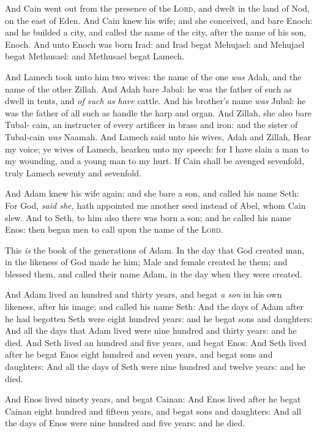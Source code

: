 \documentclass[11pt,letterpaper,oneside]{memoir}
\begin{document}
And Cain went out from the presence of the \textsc{Lord}, and dwelt in the
land of Nod, on the east of Eden. And Cain knew his wife; and she
conceived, and bare Enoch: and he builded a city, and called the name of
the city, after the name of his son, Enoch. And unto Enoch was born
Irad: and Irad begat Mehujael: and Mehujael begat Methusael: and
Methusael begat Lamech.

And Lamech took unto him two wives: the name of the one \emph{was} Adah,
and the name of the other Zillah. And Adah bare Jabal: he was the father
of such as dwell in tents, and \emph{of such as have} cattle. And his
brother's name \emph{was} Jubal: he was the father of all such as handle
the harp and organ. And Zillah, she also bare Tubal- cain, an instructer
of every artificer in brass and iron: and the sister of Tubal-cain
\emph{was} Naamah. And Lamech said unto his wives, Adah and Zillah, Hear
my voice; ye wives of Lamech, hearken unto my speech: for I have slain a
man to my wounding, and a young man to my hurt. If Cain shall be avenged
sevenfold, truly Lamech seventy and sevenfold.

And Adam knew his wife again; and she bare a son, and called his name
Seth: For God, \emph{said she,} hath appointed me another seed instead
of Abel, whom Cain slew. And to Seth, to him also there was born a son;
and he called his name Enos: then began men to call upon the name of the
\textsc{Lord}.

This \emph{is} the book of the generations of Adam. In the day that God
created man, in the likeness of God made he him; Male and female created
he them; and blessed them, and called their name Adam, in the day when
they were created.

And Adam lived an hundred and thirty years, and begat \emph{a son} in
his own likeness, after his image; and called his name Seth: And the
days of Adam after he had begotten Seth were eight hundred years: and he
begat sons and daughters: And all the days that Adam lived were nine
hundred and thirty years: and he died. And Seth lived an hundred and
five years, and begat Enos: And Seth lived after he begat Enos eight
hundred and seven years, and begat sons and daughters: And all the days
of Seth were nine hundred and twelve years: and he died.

And Enos lived ninety years, and begat Cainan: And Enos lived after he
begat Cainan eight hundred and fifteen years, and begat sons and
daughters: And all the days of Enos were nine hundred and five years:
and he died.
\end{document}
